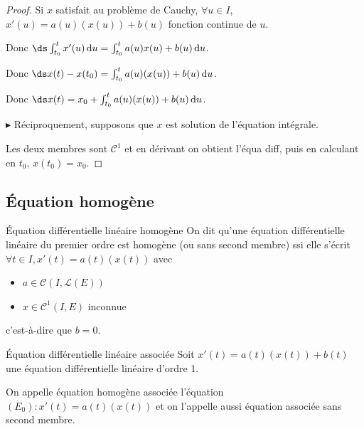 \begin{proof}
    Si $x$ satisfait au problème de Cauchy, $\forall u \in I$, 
    $x'(u) = a(u)(x(u)) + b(u)$ fonction continue de $u$. 

    Donc $\ds \int_{t_0}^{t } x'(u) \, \mathrm d u = \int_{t_0}^{t} a(u)x(u) + b(u) \, \mathrm d u$.

    Donc $\ds x(t) - x(t_0) = \int_{t_0}^{t} a(u)(x(u)) + b(u) \, \mathrm d u$.

    Donc $\ds x(t) = x_0 + \int_{t_0}^{t} a(u)(x(u)) + b(u) \, \mathrm d u$.

    \avspace $\blacktriangleright$ Réciproquement, supposons que $x$ est solution de l'équation intégrale.

    Les deux membres sont $\mathscr C^1$ et en dérivant on obtient l'équa diff, puis en 
    calculant en $t_0$, $x(t_0) = x_0$.
\end{proof}

\subsection{\'Equation homogène}

\begin{definition}{\'Equation différentielle linéaire homogène}{}
    On dit qu'une équation différentielle linéaire du premier ordre est homogène (ou sans second membre)
    ssi elle s'écrit $\forall t \in I, x'(t) = a(t)(x(t))$ avec 

    \begin{itemize}
        \item $a \in \mathscr C(I, \mathscr L(E))$
        \item $x \in \mathscr C^1(I, E)$ inconnue
    \end{itemize}

    c'est-à-dire que $b = 0$. 
\end{definition}


\begin{definition}{\'Equation différentielle linéaire associée}{}
    Soit $x'(t) = a(t)(x(t)) + b(t)$ une équation différentielle linéaire d'ordre 1. 

    On appelle équation homogène associée l'équation 
    $(E_0) : x'(t) = a(t)(x(t))$ et on l'appelle aussi équation associée sans second membre.
\end{definition}

